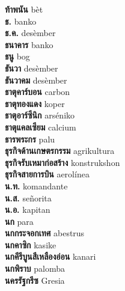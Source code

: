 \textbf{ ท้าพนัน  } bèt \\
\textbf{ ธ.  } banko \\
\textbf{ ธ.ค.  } desèmber \\
\textbf{ ธนาคาร  } banko \\
\textbf{ ธนู  } bog \\
\textbf{ ธันวา  } desèmber \\
\textbf{ ธันวาคม  } desèmber \\
\textbf{ ธาตุคาร์บอน  } carbon \\
\textbf{ ธาตุทองแดง  } koper \\
\textbf{ ธาตุอาร์ซีนิก  } arséniko \\
\textbf{ ธาตุแคลเซียม  } calcium \\
\textbf{ ธารพระกร  } palu \\
\textbf{ ธุรกิจด้านเกษตรกรรม  } agrikultura \\
\textbf{ ธุรกิจรับเหมาก่อสร้าง  } konstrukshon \\
\textbf{ ธุรกิจสายการบิน  } aerolínea \\
\textbf{ น.ท.  } komandante \\
\textbf{ น.ส.  } señorita \\
\textbf{ น.อ.  } kapitan \\
\textbf{ นก  } para \\
\textbf{ นกกระจอกเทศ  } abestrus \\
\textbf{ นกคาซิก  } kasike \\
\textbf{ นกคีรีบูนสีเหลืองอ่อน  } kanari \\
\textbf{ นกพิราบ  } palomba \\
\textbf{ นครรัฐกรีซ  } Gresia \\
